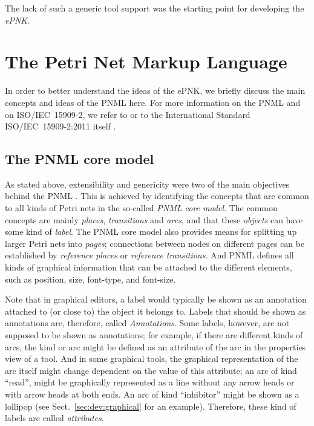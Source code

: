The lack of such a generic tool support was the starting point for
developing the \emph{ePNK}.

\section{The Petri Net Markup Language}
\label{sec:intro:PNML}
In order to better understand the ideas of the ePNK, we briefly discuss the
main concepts and ideas of the PNML here. For more information
on the PNML and on ISO/IEC~15909-2, we refer to \cite{Kin06,HKea09} or to
the International Standard ISO/IEC~15909-2:2011 itself
\cite{ISO-IEC:15909-2-2011}.

\subsection{The PNML core model}
\label{subsec:PNMLcoremodel}

As stated above, extensibility and genericity were two of the main
objectives behind the PNML \cite{JKW00}. This is achieved by identifying the
concepts that are common to all kinds of Petri nets in the so-called \emph{PNML
core model}.%
The common concepts are mainly \emph{places}, \emph{transitions}%
and \emph{arcs}, and that these \emph{objects} can have some kind of%
\emph{label}.%
The PNML core model also provides means for splitting up larger
Petri nets into \emph{pages};%
connections between nodes on
different pages can be established by \emph{reference places} or%
\emph{reference transitions}. And PNML defines all kinds of graphical%
information that can be attached to the different elements, such as
position, size, font-type, and font-size.

Note that in graphical editors, a label would typically be shown as
an annotation attached to (or close to) the object it belongs to.  Labels
that should be shown as annotations are, therefore, called \emph{Annotations}.%
Some labels, however, are not supposed
to be shown as annotations; for example, if there are different kinds of
arcs, the kind or arc might be defined as an attribute of the
arc in the properties view of a tool. And in some graphical tools,
the graphical representation of the arc itself might change dependent
on the value of this attribute; an arc of kind ``read'',
might be graphically represented as a line without any arrow heads or with
arrow heads at both ends. An arc of kind ``inhibitor'' might be shown as a
lollipop (see Sect.~\ref{sec:dev:graphical} for an example). Therefore, these
kind of labels are called \emph{attributes}.%

